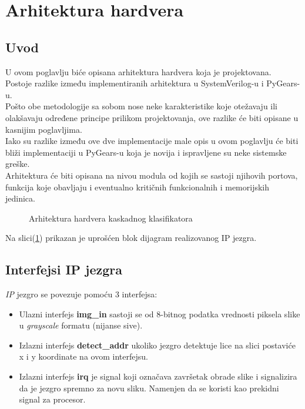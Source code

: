\section{Arhitektura hardvera}

\subsection{Uvod}\label{hw_arch_intro}

U ovom poglavlju biće opisana arhitektura hardvera koja je projektovana. \\
Postoje razlike između implementiranih arhitektura u SystemVerilog-u i PyGears-u. \\
Pošto obe metodologije sa sobom nose neke karakteristike koje otežavaju ili
olakšavaju određene principe prilikom projektovanja, ove razlike će biti opisane
u kasnijim poglavljima. \\

Iako su razlike između ove dve implementacije male opis u ovom poglavlju će biti
bliži implementaciji u PyGears-u koja je novija i ispravljene su neke sistemske
greške. \\

Arhitektura će biti opisana na nivou modula od kojih se sastoji njihovih
portova, funkcija koje obavljaju i eventualno kritičnih funkcionalnih i memorijskih jedinica.

\begin{figure}[H]
\centering{
  \scalebox{0.8}{
    
  }}
\caption{Arhitektura hardvera kaskadnog klasifikatora}
\label{hw_arch_top}
\end{figure}

Na slici(\ref{hw_arch_top}) prikazan je uprošćen blok dijagram realizovanog IP jezgra.

\subsection{Interfejsi IP jezgra}
\emph{IP} jezgro se povezuje pomoću 3 interfejsa:

\begin{itemize}
  \item Ulazni interfejs \textbf{img\_in} sastoji se od 8-bitnog podatka
    vrednosti piksela slike u \emph{grayscale} formatu (nijanse sive).
  \item Izlazni interfejs \textbf{detect\_addr} ukoliko jezgro detektuje lice na slici
    postaviće x i y koordinate na ovom interfejsu.
  \item Izlazni interfejs \textbf{irq} je signal koji označava završetak obrade slike i
    signalizira da je jezgro spremno za novu sliku.
    Namenjen da se koristi kao prekidni signal za procesor.
\end{itemize}

